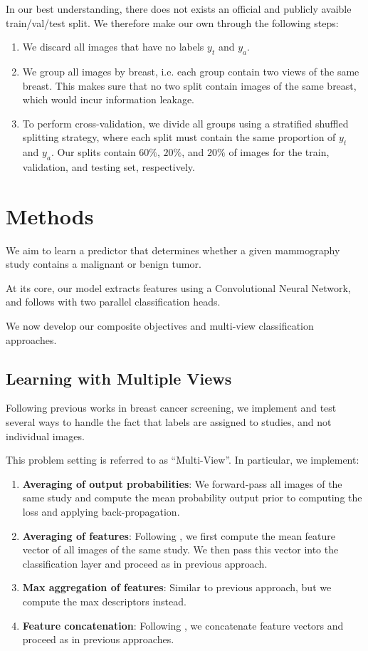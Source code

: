 \documentclass[11pt]{article}
\begin{document}
In our best understanding, there does not exists an official and publicly avaible train/val/test
split. We therefore make our own through the following steps:

\begin{enumerate}
\item We discard all images that have no labels \(y_t\) and \(y_a\).
\item We group all images by breast, i.e. each group contain two views of the same breast.
This makes sure that no two split contain images of the same breast, which would
incur information leakage.
\item To perform cross-validation, we divide all groups using a stratified
shuffled splitting strategy, where each split
must contain the same proportion of \(y_t\) and \(y_a\). Our splits contain \(60\%\),
 \(20\%\), and \(20\%\) of images for the train, validation, and testing set, respectively.
\end{enumerate}

\section{Methods}
\label{sec:org5862d6e}

We aim to learn a predictor that determines whether a given mammography study
contains a malignant or benign tumor.

At its core, our model extracts features using a Convolutional Neural Network,
and follows with two parallel classification heads.

We now develop our composite objectives and multi-view classification approaches.

\subsection{\label{multiview}Learning with Multiple Views}
\label{sec:orgfa21d5f}

Following previous works in breast cancer screening,
we implement and test several ways to handle the fact that
labels are assigned to studies, and not individual images.

This problem setting is referred to as ``Multi-View''.
In particular, we implement:

\begin{enumerate}
\item \textbf{Averaging of output probabilities}:  We forward-pass all images of the same study
and compute the mean probability output prior to computing the loss and applying
back-propagation.
\item \textbf{Averaging of features}: Following \autocite{geras17} \autocite{seeland21}, we first compute the mean feature vector of all images of the same
study. We then pass this vector into the classification layer and proceed as in
previous approach.
\item \textbf{Max aggregation of features}: Similar to previous approach, but we compute the max descriptors instead.
\item \textbf{Feature concatenation}: Following \autocite{wu19} \autocite{chen22}, we concatenate feature
vectors and proceed as in previous approaches.
\end{enumerate}
\end{document}
